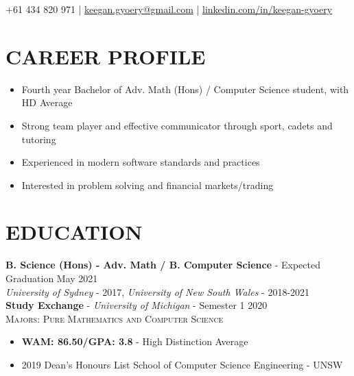 \documentclass[a4paper,11pt]{article} %
\begin{document}
\pagestyle{empty} %



\par{ %

\begin{center}
	+61 434 820 971 | \href{mailto:keegan.gyoery@gmail.com}{keegan.gyoery@gmail.com} | \url{linkedin.com/in/keegan-gyoery}
\end{center}

\section{CAREER PROFILE}

\begin{itemize}[wide]
	\item Fourth year Bachelor of Adv. Math (Hons) / Computer Science student, with HD Average
	\item Strong team player and effective communicator through sport, cadets and tutoring
	\item Experienced in modern software standards and practices
	\item Interested in problem solving and financial markets/trading
\end{itemize}

\section{EDUCATION}

{\raggedright
\textbf{B. Science (Hons) - Adv. Math / B. Computer Science} - Expected Graduation May 2021\\
\textit{University of Sydney} - 2017, 
\textit{University of New South Wales} - 2018-2021\\
\textbf{Study Exchange} - \textit{University of Michigan} - Semester 1 2020\\
\textsc{Majors: Pure Mathematics and Computer Science}\\
}

\begin{itemize}[wide]
\item \textbf{WAM: 86.50/GPA: 3.8} - High Distinction Average
\item 2019 Dean's Honours List School of Computer Science Engineering - UNSW
\end{itemize}

}
\end{document}
